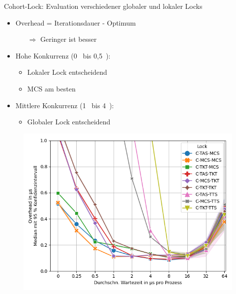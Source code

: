 \documentclass[fleqn,compress,utf8,aspectratio=169,t]{beamer}
\begin{document}
\begin{frame}{Cohort-Lock: Evaluation verschiedener globaler und lokaler Locks}
    \begin{minipage}{.52\textwidth}
        \begin{itemize}
            \setlength\itemsep{.75em}
            \item Overhead = Iterationsdauer - Optimum
                  \vspace{.75em}
                  \begin{itemize}
                      \setlength\itemsep{.75em}
                      \item[$\Rightarrow$] Geringer ist besser
                  \end{itemize}
            \item<2-> Hohe Konkurrenz (0~ bis 0,5~):
                  \vspace{.75em}
                  \begin{itemize}
                      \setlength\itemsep{.75em}
                      \item Lokaler Lock entscheidend
                      \item MCS am besten
                  \end{itemize}
            \item<3-> Mittlere Konkurrenz (1~ bis 4~):
                  \vspace{.75em}
                  \begin{itemize}
                      \setlength\itemsep{.75em}
                      \item Globaler Lock entscheidend
                  \end{itemize}
        \end{itemize}
    \end{minipage}
    \begin{minipage}{.47\textwidth}
        \begin{figure}
            \begin{overprint}
                \includegraphics[width=\textwidth]{../../Dokumentation/Latex/Bilder/benchmarks/intelmpi/cohort-mcs-spin-tkt/WBAB-processes=112,mpi_progress=1-overhead}

\end{overprint}
\end{figure}
\end{minipage}
\end{frame}
\end{document}

